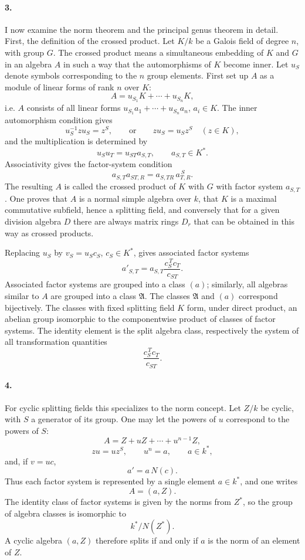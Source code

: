 \documentclass[11pt]{article}
\begin{document}
\paragraph{3.}
I now examine the norm theorem and the principal genus theorem in detail. First, the definition of the crossed product. Let \(K/k\) be a Galois field of degree \(n\), with group \(G\). The crossed product means a simultaneous embedding of \(K\) and \(G\) in an algebra \(A\) in such a way that the automorphisms of \(K\) become inner. Let \(u_S\) denote symbols corresponding to the \(n\) group elements. First set up \(A\) as a module of linear forms of rank \(n\) over \(K\):
\[
        A=u_{S_1}K+\cdots+u_{S_n}K ,
\]
i.e. \(A\) consists of all linear forms \(u_{S_1}a_1+\cdots+u_{S_n}a_n\), \(a_i\in K\). The inner automorphism condition gives
\[
        u_S^{-1}zu_S=z^S,\qquad\text{or}\qquad
        zu_S=u_Sz^S\quad (z\in K),
\]
and the multiplication is determined by
\[
        u_Su_T=u_{ST}a_{S,T},\qquad a_{S,T}\in K^* .
\]
Associativity gives the factor-system condition
\[
        a_{S,T}a_{ST,R}=a_{S,TR}\,a_{T,R}^{\,S}.
\]
The resulting \(A\) is called the crossed product of \(K\) with \(G\) with factor system \(a_{S,T}\). One proves that \(A\) is a normal simple algebra over \(k\), that \(K\) is a maximal commutative subfield, hence a splitting field, and conversely that for a given division algebra \(D\) there are always matrix rings \(D_r\) that can be obtained in this way as crossed products.

Replacing \(u_S\) by \(v_S=u_Sc_S\), \(c_S\in K^*\), gives associated factor systems
\[
        a'_{S,T}=a_{S,T}\frac{c_S^{\,T}c_T}{c_{ST}}.
\]
Associated factor systems are grouped into a class \((a)\); similarly, all algebras similar to \(A\) are grouped into a class \(\mathfrak A\). The classes \(\mathfrak A\) and \((a)\) correspond bijectively. The classes with fixed splitting field \(K\) form, under direct product, an abelian group isomorphic to the componentwise product of classes of factor systems. The identity element is the split algebra class, respectively the system of all transformation quantities
\[
        \frac{c_S^{\,T}c_T}{c_{ST}}.
\]

\paragraph{4.}
For cyclic splitting fields this specializes to the norm concept. Let \(Z/k\) be cyclic, with \(S\) a generator of its group. One may let the powers of \(u\) correspond to the powers of \(S\):
\[
        A=Z+uZ+\cdots+u^{n-1}Z,
\]
\[
        zu=uz^S,\qquad u^n=a,\qquad a\in k^*,
\]
and, if \(v=uc\),
\[
        a'=a\,N(c).
\]
Thus each factor system is represented by a single element \(a\in k^*\), and one writes
\[
        A=(a,Z).
\]
The identity class of factor systems is given by the norms from \(Z^*\), so the group of algebra classes is isomorphic to
\[
        k^*/N(Z^*).
\]
A cyclic algebra \((a,Z)\) therefore splits if and only if \(a\) is the norm of an element of \(Z\).
\end{document}
